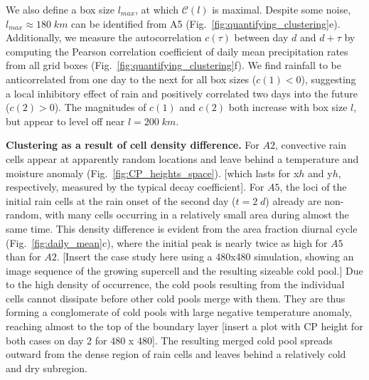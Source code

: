 \documentclass{article}
\begin{document}
We also define a box size $l_{max}$, at which $\mathcal{C}(l)$ is maximal.
Despite some noise, $l_{max}\approx 180\;km$ can be identified from A5 (Fig.~\ref{fig:quantifying_clustering}e).
Additionally, we measure the autocorrelation $c(\tau)$ between day $d$ and $d+\tau$ by computing the Pearson correlation coefficient of daily mean precipitation rates from all grid boxes (Fig.~\ref{fig:quantifying_clustering}f). 
We find rainfall to be anticorrelated from one day to the next for all box sizes   ($c(1)<0$), suggesting a local inhibitory effect of rain and positively correlated two days into the future ($c(2)>0$).
The magnitudes of $c(1)$ and $c(2)$ both increase with box size $l$, but appear to level off near $l=200\;km$.

\noindent
{\bf Clustering as a result of cell density difference.}
For $A2$, convective rain cells appear at apparently random locations and leave behind a temperature and moisture anomaly (Fig.~\ref{fig:CP_heights_space}). 
[which lasts for x$h$ and y$h$, respectively, measured by the typical decay coefficient].
For $A5$, the loci of the initial rain cells at the rain onset of the second day ($t=2\;d$) already are non-random, with many cells occurring in a relatively small area during almost the same time. 
This density difference is evident from the area fraction diurnal cycle (Fig.~\ref{fig:daily_mean}c), where the initial peak is nearly twice as high for $A5$ than for $A2$. 
[Insert the case study here using a 480x480 simulation, showing an image sequence of the growing supercell and the resulting sizeable cold pool.]
Due to the high density of occurrence, the cold pools resulting from the individual cells cannot dissipate before other cold pools merge with them.
They are thus forming a conglomerate of cold pools with large negative temperature anomaly, reaching almost to the top of the boundary layer [insert a plot with CP height for both cases on day 2 for 480 x 480].
The resulting merged cold pool spreads outward from the dense region of rain cells and leaves behind a relatively cold and dry subregion.
\end{document}

